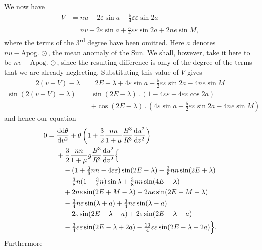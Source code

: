 \par\noindent\hspace*{\parindent}We now have
\[
\begin{aligned}
V&=nu-2\varepsilon\sin a+\tfrac54\varepsilon\varepsilon\sin2a\\
 &=nv-2\varepsilon\sin a+\tfrac54\varepsilon\varepsilon\sin2a+2ne\sin M,
\end{aligned}
\]
\noindent where the terms of the 3\textsuperscript{rd} degree have been omitted.
Here \(a\) denotes \(nu-\mathrm{Apog.}\,\odot\), the mean anomaly of the Sun.
We shall, however, take it here to be \(nv-\mathrm{Apog.}\,\odot\), since the resulting
difference is only of the degree of the terms that we are
already neglecting. Substituting this value of \(V\) gives
\[
\begin{aligned}
2(v-V)-\lambda={}&2E-\lambda+4\varepsilon\sin a
-\tfrac52\varepsilon\varepsilon\sin2a-4ne\sin M
\end{aligned}
\]
\[
\begin{aligned}
\sin(2(v-V)-\lambda)={}&\sin(2E-\lambda)\mathbin{.}
(1-4\varepsilon\varepsilon+4\varepsilon\varepsilon\cos2a)\\
&+\cos(2E-\lambda)\mathbin{.}
(4\varepsilon\sin a-\tfrac52\varepsilon\varepsilon\sin2a-4ne\sin M)
\end{aligned}
\]
\noindent and hence our equation
\[
\begin{aligned}
0={}&\frac{\mathrm{dd}\theta}{\mathrm{d}v^2}
+\theta\left(1+\frac32\frac{nn}{1+\mu}\frac{B^3}{R^3}
\frac{\mathrm{d}u^2}{\mathrm{d}v^2}\right)\\
&+\frac32\frac{nn}{1+\mu}g\frac{B^3}{R^3}\frac{\mathrm{d}u^2}{\mathrm{d}v^2}\Bigl\{\\
&\quad -(1+\tfrac38nn-4\varepsilon\varepsilon)\sin(2E-\lambda)
-\tfrac38nn\sin(2E+\lambda)\\
&\quad -\tfrac38n(1-\tfrac34n)\sin\lambda+\tfrac38nn\sin(4E-\lambda)\\
&\quad +2ne\sin(2E+M-\lambda)-2ne\sin(2E-M-\lambda)\\
&\quad -\tfrac34n\varepsilon\sin(\lambda+a)+\tfrac34n\varepsilon\sin(\lambda-a)\\
&\quad -2\varepsilon\sin(2E-\lambda+a)+2\varepsilon\sin(2E-\lambda-a)\\
&\quad -\tfrac34\varepsilon\varepsilon\sin(2E-\lambda+2a)
-\tfrac{13}{4}\varepsilon\varepsilon\sin(2E-\lambda-2a)\Bigr\}.
\end{aligned}
\]
\noindent Furthermore
